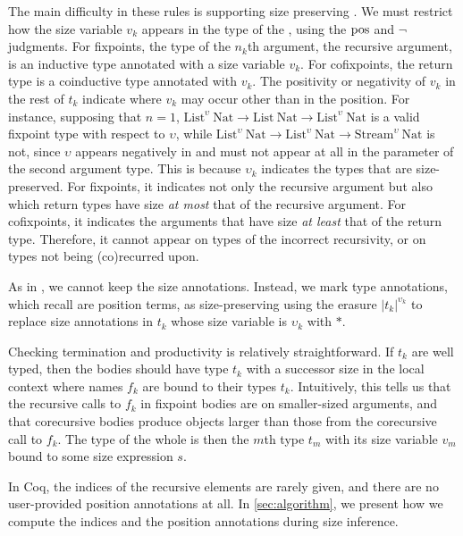 The main difficulty in these rules is supporting size preserving \cofixpoints.
We must restrict how the size variable $v_k$ appears in the type of the \cofixpoints, using the $\mathrel{\text{pos}}$ and $\neg$ judgments.
For fixpoints, the type of the $n_k$th argument, the recursive argument, is an inductive type annotated with a size variable $v_k$.
For cofixpoints, the return type is a coinductive type annotated with $v_k$.
The positivity or negativity of $v_k$ in the rest of $t_k$ indicate where $v_k$ may occur other than in the \corecursive position.
For instance, supposing that $n = 1$,
$\text{List}^\upsilon ~ \text{Nat} \to \text{List} ~ \text{Nat} \to \text{List}^\upsilon ~ \text{Nat}$
is a valid fixpoint type with respect to $\upsilon$, while
$\text{List}^\upsilon ~ \text{Nat} \to \text{List}^\upsilon ~ \text{Nat} \to \text{Stream}^\upsilon ~ \text{Nat}$
is not, since $\upsilon$ appears negatively in  and must not appear at all in the parameter of the second  argument type.
This is because $\upsilon_k$ indicates the types that are size-preserved.
For fixpoints, it indicates not only the recursive argument but also which return types have size \textit{at most} that of the recursive argument.
For cofixpoints, it indicates the arguments that have size \textit{at least} that of the return type.
Therefore, it cannot appear on types of the incorrect recursivity, or on types not being (co)\-recurred upon.

As in , we cannot keep the size annotations.
Instead, we mark \cofixpoint type annotations, which recall are position terms,
as size-preserving using the erasure $|t_k|^{\upsilon_k}$ to replace size
annotations in $t_k$ whose size variable is $\upsilon_k$ with $*$.

Checking termination and productivity is relatively straightforward.
If $t_k$ are well typed, then the \cofixpoint bodies should have type $t_k$ with a successor size in the local context where \cofixpoint names $f_k$ are bound to their types $t_k$.
Intuitively, this tells us that the recursive calls to $f_k$ in fixpoint bodies are on smaller-sized arguments, and that corecursive bodies produce objects larger than those from the corecursive call to $f_k$.
The type of the whole \cofixpoint is then the $m$th type $t_m$ with its size variable $v_m$ bound to some size expression $s$.

In Coq, the indices of the recursive elements are rarely given, and there are no user-provided position annotations at all.
In \autoref{sec:algorithm}, we present how we compute the indices and the position annotations during size inference.
